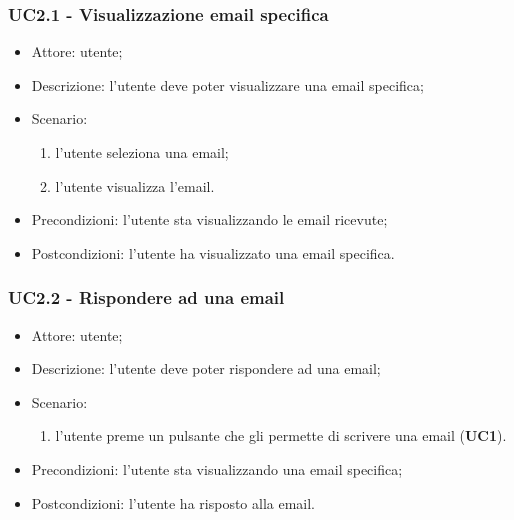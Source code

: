     \subsubsection{UC2.1 - Visualizzazione email specifica}
    \begin{itemize}
        \item Attore: utente;
        \item Descrizione: l'utente deve poter visualizzare una email specifica;
        \item Scenario:
        \begin{enumerate}
        \item l'utente seleziona una email;
        \item l'utente visualizza l'email.
        \end{enumerate}
        \item Precondizioni: l'utente sta visualizzando le email ricevute;
        \item Postcondizioni: l'utente ha visualizzato una email specifica.
    \end{itemize}

    \subsubsection{UC2.2 - Rispondere ad una email}
    \begin{itemize}
        \item Attore: utente;
        \item Descrizione: l'utente deve poter rispondere ad una email;
        \item Scenario:
        \begin{enumerate}
        \item l'utente preme un pulsante che gli permette di scrivere una email (\textbf{UC1}).
        \end{enumerate}
        \item Precondizioni: l'utente sta visualizzando una email specifica;
        \item Postcondizioni: l'utente ha risposto alla email.
    \end{itemize}


